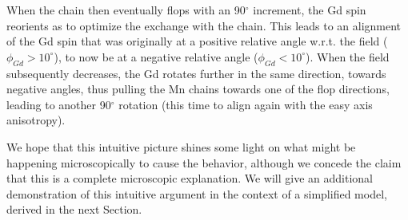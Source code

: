 When the chain then eventually flops with an 90$^\circ$ increment, the Gd spin reorients as to optimize the exchange with the chain.
This leads to an alignment of the Gd spin that was originally at a positive relative angle w.r.t. the field ($\phi_{Gd}>10^\circ$), to now be at a negative relative angle ($\phi_{Gd}<10^\circ$).
When the field subsequently decreases, the Gd rotates further in the same direction, towards negative angles, thus pulling the Mn chains towards one of the flop directions, leading to another 90$^\circ$ rotation (this time to align again with the easy axis anisotropy).

%
We hope that this intuitive picture shines some light on what might be happening microscopically to cause the behavior, although we concede the claim that this is a complete microscopic explanation. We will give an additional demonstration of this intuitive argument in the context of a simplified model, derived in the next Section.

